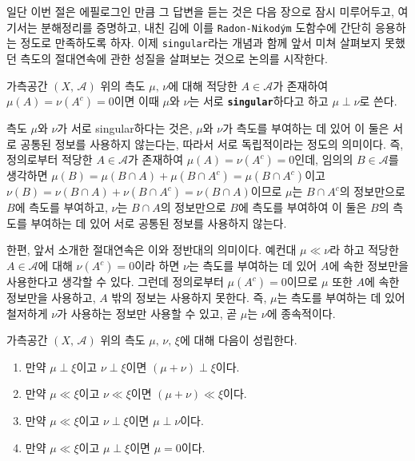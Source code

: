 일단 이번 절은 에필로그인 만큼 그 답변을 듣는 것은 다음 장으로 잠시 미루어두고, 여기서는 분해정리를 증명하고, 내친 김에 이를 \texttt{Radon-Nikod\'ym} 도함수에 간단히 응용하는 정도로 만족하도록 하자. 이제 \texttt{singular}라는 개념과 함께 앞서 미쳐 살펴보지 못했던 측도의 절대연속에 관한 성질을 살펴보는 것으로 논의를 시작한다.

\begin{definition}
    가측공간 $(X,\,\mathcal{A})$ 위의 측도 $\mu,\,\nu$에 대해 적당한 $A\in\mathcal{A}$가 존재하여 $\mu(A)=\nu(A^c)=0$이면 이때 $\mu$와 $\nu$는 서로 \textbf{\texttt{singular}}하다고 하고 $\mu\perp\nu$로 쓴다.
\end{definition}

측도 $\mu$와 $\nu$가 서로 singular하다는 것은, $\mu$와 $\nu$가 측도를 부여하는 데 있어 이 둘은 서로 공통된 정보를 사용하지 않는다는, 따라서 서로 독립적이라는 정도의 의미이다. 즉, 정의로부터 적당한 $A\in\mathcal{A}$가 존재하여 $\mu(A)=\nu(A^c)=0$인데, 임의의 $B\in\mathcal{A}$를 생각하면 $\mu(B)=\mu(B\cap A)+\mu(B\cap A^c)=\mu(B\cap A^c)$이고 $\nu(B)=\nu(B\cap A)+\nu(B\cap A^c)=\nu(B\cap A)$이므로 $\mu$는 $B\cap A^c$의 정보만으로 $B$에 측도를 부여하고, $\nu$는 $B\cap A$의 정보만으로 $B$에 측도를 부여하여 이 둘은 $B$의 측도를 부여하는 데 있어 서로 공통된 정보를 사용하지 않는다.

한편, 앞서 소개한 절대연속은 이와 정반대의 의미이다. 예컨대 $\mu\ll\nu$라 하고 적당한 $A\in\mathcal{A}$에 대해 $\nu(A^c)=0$이라 하면 $\nu$는 측도를 부여하는 데 있어 $A$에 속한 정보만을 사용한다고 생각할 수 있다. 그런데 정의로부터 $\mu(A^c)=0$이므로 $\mu$ 또한 $A$에 속한 정보만을 사용하고, $A$ 밖의 정보는 사용하지 못한다. 즉, $\mu$는 측도를 부여하는 데 있어 철저하게 $\nu$가 사용하는 정보만 사용할 수 있고, 곧 $\mu$는 $\nu$에 종속적이다.

\begin{proposition}
    가측공간 $(X,\,\mathcal{A})$ 위의 측도 $\mu,\,\nu,\,\xi$에 대해 다음이 성립한다.
    \begin{enumerate}
        \item 만약 $\mu\perp\xi$이고 $\nu\perp\xi$이면 $(\mu+\nu)\perp\xi$이다.
        \item 만약 $\mu\ll\xi$이고 $\nu\ll\xi$이면 $(\mu+\nu)\ll\xi$이다.
        \item 만약 $\mu\ll\xi$이고 $\nu\perp\xi$이면 $\mu\perp\nu$이다.
        \item 만약 $\mu\ll\xi$이고 $\mu\perp\xi$이면 $\mu=0$이다. 
    \end{enumerate}
\end{proposition}

